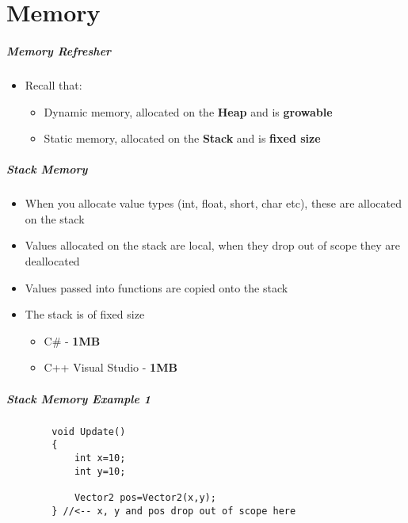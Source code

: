 \part{Memory}
\frame{\partpage}

\begin{frame}
\frametitle{Memory Refresher}
	\begin{itemize}
		\pause \item Recall that:
		\begin{itemize}
			\pause \item Dynamic memory, allocated on the \textbf{Heap} and is \textbf{growable}
			\pause \item Static memory, allocated on the \textbf{Stack} and is \textbf{fixed size}
		\end{itemize}
	\end{itemize}
\end{frame}

\begin{frame}
\frametitle{Stack Memory}
	\begin{itemize}
		\pause \item When you allocate value types (int, float, short, char etc), these are allocated on the stack
		\pause \item Values allocated on the stack are local, when they drop out of scope they are deallocated  
		\pause \item Values passed into functions are copied onto the stack
		\pause \item The stack is of fixed size
		\begin{itemize}
			\item C\# - \textbf{1MB}
			\item C++ Visual Studio - \textbf{1MB}
		\end{itemize}
	\end{itemize}
\end{frame}

\begin{frame}[fragile]
\frametitle{Stack Memory Example 1}
	\begin{lstlisting}
		void Update()
		{
			int x=10;
			int y=10;
	
			Vector2 pos=Vector2(x,y);
		} //<-- x, y and pos drop out of scope here
	\end{lstlisting} 
\end{frame}

